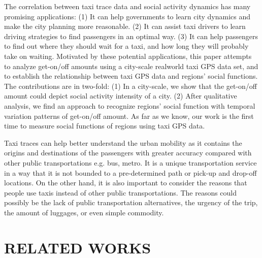 \documentclass[a4paper, 10pt, conference]{ieeeconf}      %
\begin{document}
The correlation between taxi trace data and social activity dynamics has many promising applications: (1) It can help governments to learn city dynamics and make the city planning more reasonable. (2) It can assist taxi drivers to learn driving strategies to find passengers in an optimal way. (3) It can help passengers to find out where they should wait for a taxi, and how long they will probably take on waiting.
Motivated by these potential applications, this paper attempts to analyze get-on/off amounts using a city-scale realworld taxi GPS data set, and to establish the relationship between taxi GPS data and regions’ social functions. The contributions are in two-fold: (1) In a city-scale, we show that the get-on/off amount could depict social activity intensity of a city. (2) After qualitative analysis, we find an approach to recognize regions’ social function with temporal variation patterns of get-on/off amount. As far as we know, our work is the first time to measure social functions of regions using taxi GPS data.

Taxi traces can help better understand the urban mobility as it contains the origins and destinations of the passengers with greater accuracy compared with other public transportations e.g. bus, metro. It is a unique transportation service in a way that it is not bounded to a pre-determined path or pick-up and drop-off locations. On the other hand, it is also important to consider the reasons that people use taxis instead of other public transportations. The reasons could possibly be the lack of public transportation alternatives, the urgency of the trip, the amount of luggages, or even simple commodity.

\section{RELATED WORKS}%
\end{document}
